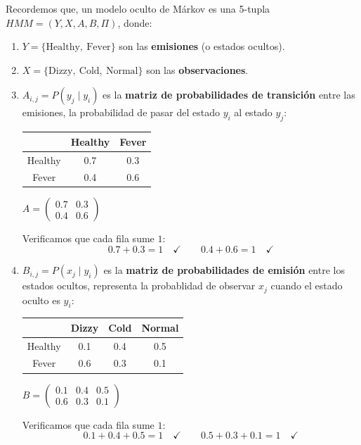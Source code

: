 Recordemos que, un modelo oculto de Márkov es una 5-tupla $HMM = (Y, X, A, B, \Pi)$, donde:
\begin{enumerate}
\item $Y = \{\text{Healthy},\ \text{Fever}\}$ son las \textbf{emisiones} (o estados ocultos).
\item $X = \{\text{Dizzy},\ \text{Cold},\ \text{Normal}\}$ son las \textbf{observaciones}.
\item $A_{i,j} = P(y_j \mid y_i)$ es la \textbf{matriz de probabilidades de transición} entre las emisiones, la probabilidad de pasar del estado $y_i$ al estado $y_j$:
  
  \begin{center}
    \begin{tabular}{|c|c|c|}
      \hline
      & Healthy & Fever \\
      \hline
      Healthy & 0.7   & 0.3  \\
      \hline
      Fever  & 0.4   & 0.6  \\
      \hline
    \end{tabular}
    \qquad
    $A = \begin{pmatrix} 0.7 & 0.3 \\ 0.4 & 0.6 \end{pmatrix}$
  \end{center}
  
  Verificamos que cada fila sume $1$:
  \[
  0.7 + 0.3 = 1 \quad\checkmark \qquad 0.4 + 0.6 = 1 \quad\checkmark
  \]

\item $B_{i,j} = P(x_j \mid y_i)$ es la \textbf{matriz de probabilidades de emisión} entre los estados ocultos, representa la probablidad de observar $x_j$ cuando el estado oculto es $y_i$:

    \begin{center}
    \begin{tabular}{|c|c|c|c|}
      \hline
      & Dizzy & Cold & Normal \\
      \hline
      Healthy & 0.1 & 0.4 & 0.5 \\
      \hline
      Fever & 0.6 & 0.3 & 0.1\\
      \hline
    \end{tabular}
    \qquad
    $B = \begin{pmatrix} 0.1 & 0.4 & 0.5 \\ 0.6 & 0.3 & 0.1 \end{pmatrix}$
    \end{center}
  
  Verificamos que cada fila sume $1$:
  \[
  0.1 + 0.4 + 0.5 = 1 \quad\checkmark \qquad 0.5 + 0.3 + 0.1 = 1 \quad\checkmark
  \]
  

\end{enumerate}
